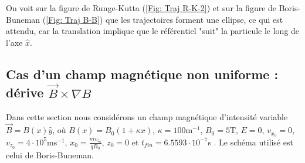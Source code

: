 \documentclass[a4paper,12pt,twoside]{article}
\begin{document}
\noindent On voit sur la figure de Runge-Kutta (\ref{Fig: Traj R-K-2}) et sur la figure de Boris-Buneman (\ref{Fig: Traj B-B}) que les trajectoires forment une ellipse, ce qui est attendu, car la translation implique que le r\'ef\'erentiel "suit" la particule le long de l'axe $\hat{x}$.


\subsection{Cas d'un champ magn\'etique non uniforme : d\'erive $\Vec{B}\times\nabla B$}
\noindent Dans cette section nous consid\'erons un champ magn\'etique d'intensit\'e variable $\Vec{B} = B(x)\hat{y}$, o\`u $B(x) = B_0(1 + \kappa x)$, $\kappa = 100$m$^{-1}$, $B_0 = 5$T, $E = 0$, $v_{x_0} = 0$, $v_{z_0} = 4\cdot10^5$ms$^{-1}$, $x_0 = \frac{mv_{z_0}}{qB_0}$, $z_0 = 0$ et $t_{fin} = 6.5593\cdot10^{-7}$s \cite{Notes}. Le sch\'ema utilis\'e est celui de Boris-Buneman.
\end{document}
